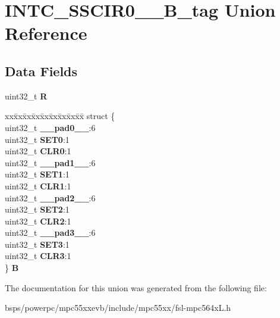 \hypertarget{unionINTC__SSCIR0__3__32B__tag}{}\section{I\+N\+T\+C\+\_\+\+S\+S\+C\+I\+R0\+\_\+\_\+B\+\_\+tag Union Reference}
\label{unionINTC__SSCIR0__3__32B__tag}
\subsection*{Data Fields}
\begin{DoxyCompactItemize}
\item 
\mbox{\label{unionINTC__SSCIR0__3__32B__tag_aa7cef2ad39d0e3d355b76acdf5e0ac7f}} 
uint32\+\_\+t {\bfseries R}
\item 
\mbox{\label{unionINTC__SSCIR0__3__32B__tag_a97c75d6545f73df9595fdcfd5a5a6ba5}} 
\begin{tabbing}
xx\=xx\=xx\=xx\=xx\=xx\=xx\=xx\=xx\=\kill
struct \{\\
\>uint32\_t {\bfseries \_\_pad0\_\_}:6\\
\>uint32\_t {\bfseries SET0}:1\\
\>uint32\_t {\bfseries CLR0}:1\\
\>uint32\_t {\bfseries \_\_pad1\_\_}:6\\
\>uint32\_t {\bfseries SET1}:1\\
\>uint32\_t {\bfseries CLR1}:1\\
\>uint32\_t {\bfseries \_\_pad2\_\_}:6\\
\>uint32\_t {\bfseries SET2}:1\\
\>uint32\_t {\bfseries CLR2}:1\\
\>uint32\_t {\bfseries \_\_pad3\_\_}:6\\
\>uint32\_t {\bfseries SET3}:1\\
\>uint32\_t {\bfseries CLR3}:1\\
\} {\bfseries B}\\

\end{tabbing}\end{DoxyCompactItemize}


The documentation for this union was generated from the following file\+:\begin{DoxyCompactItemize}
\item 
bsps/powerpc/mpc55xxevb/include/mpc55xx/fsl-\/mpc564x\+L.\+h\end{DoxyCompactItemize}
